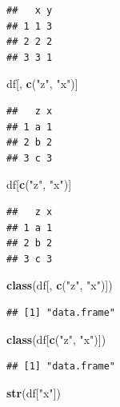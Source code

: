 \documentclass[]{article}
\newenvironment{Shaded}{\begin{snugshade}}{\end{snugshade}}
\newcommand{\KeywordTok}[1]{\textcolor[rgb]{0.13,0.29,0.53}{\textbf{{#1}}}}
\newcommand{\StringTok}[1]{\textcolor[rgb]{0.31,0.60,0.02}{{#1}}}
\newcommand{\NormalTok}[1]{{#1}}
\begin{document}
\begin{verbatim}
##   x y
## 1 1 3
## 2 2 2
## 3 3 1
\end{verbatim}

\begin{Shaded}
\begin{Highlighting}[]
\NormalTok{df[, }\KeywordTok{c}\NormalTok{(}\StringTok{"z"}\NormalTok{, }\StringTok{"x"}\NormalTok{)]}
\end{Highlighting}
\end{Shaded}

\begin{verbatim}
##   z x
## 1 a 1
## 2 b 2
## 3 c 3
\end{verbatim}

\begin{Shaded}
\begin{Highlighting}[]
\NormalTok{df[}\KeywordTok{c}\NormalTok{(}\StringTok{"z"}\NormalTok{, }\StringTok{"x"}\NormalTok{)]}
\end{Highlighting}
\end{Shaded}

\begin{verbatim}
##   z x
## 1 a 1
## 2 b 2
## 3 c 3
\end{verbatim}

\begin{Shaded}
\begin{Highlighting}[]
\KeywordTok{class}\NormalTok{(df[, }\KeywordTok{c}\NormalTok{(}\StringTok{"z"}\NormalTok{, }\StringTok{"x"}\NormalTok{)])}
\end{Highlighting}
\end{Shaded}

\begin{verbatim}
## [1] "data.frame"
\end{verbatim}

\begin{Shaded}
\begin{Highlighting}[]
\KeywordTok{class}\NormalTok{(df[}\KeywordTok{c}\NormalTok{(}\StringTok{"z"}\NormalTok{, }\StringTok{"x"}\NormalTok{)])}
\end{Highlighting}
\end{Shaded}

\begin{verbatim}
## [1] "data.frame"
\end{verbatim}

\begin{Shaded}
\begin{Highlighting}[]
\KeywordTok{str}\NormalTok{(df[}\StringTok{"x"}\NormalTok{])}
\end{Highlighting}
\end{Shaded}
\end{document}
